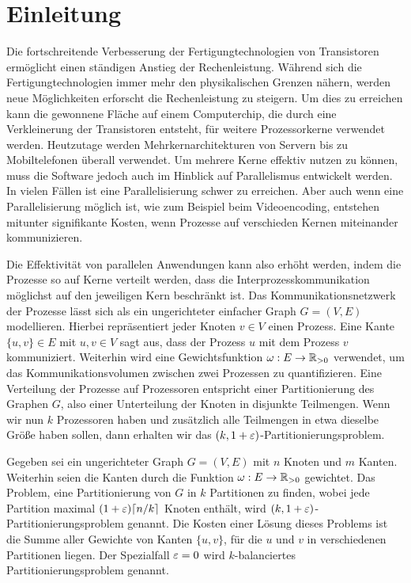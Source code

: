 
\chapter{Einleitung}\label{chapter:introduction}
Die fortschreitende Verbesserung der Fertigungtechnologien von Transistoren ermöglicht einen ständigen Anstieg der Rechenleistung.
Während sich die Fertigungtechnologien immer mehr den physikalischen Grenzen nähern, werden neue Möglichkeiten erforscht die Rechenleistung zu steigern.
Um dies zu erreichen kann die gewonnene Fläche auf einem Computerchip, die durch eine Verkleinerung der Transistoren entsteht, für weitere Prozessorkerne verwendet werden.
Heutzutage werden Mehrkernarchitekturen von Servern bis zu Mobiltelefonen überall verwendet.
Um mehrere Kerne effektiv nutzen zu können, muss die Software jedoch auch im Hinblick auf Parallelismus entwickelt werden.
In vielen Fällen ist eine Parallelisierung schwer zu erreichen.
Aber auch wenn eine Parallelisierung möglich ist, wie zum Beispiel beim Videoencoding, entstehen mitunter signifikante Kosten, wenn Prozesse auf verschieden Kernen miteinander kommunizieren.~\cite{LTS09}

Die Effektivität von parallelen Anwendungen kann also erhöht werden, indem die Prozesse so auf Kerne verteilt werden, dass die Interprozesskommunikation möglichst auf den jeweiligen Kern beschränkt ist.
Das Kommunikationsnetzwerk der Prozesse lässt sich als ein ungerichteter einfacher Graph $G = (V, E)$ modellieren.
Hierbei repräsentiert jeder Knoten $v \in V$ einen Prozess.
Eine Kante $\{u, v\} \in E$ mit $u, v \in V$ sagt aus, dass der Prozess $u$ mit dem Prozess $v$ kommuniziert.
Weiterhin wird eine Gewichtsfunktion $\omega : E \rightarrow \mathbb{R}_{>0}$ verwendet, um das Kommunikationsvolumen zwischen zwei Prozessen zu quantifizieren.
Eine Verteilung der Prozesse auf Prozessoren entspricht einer Partitionierung des Graphen $G$, also einer Unterteilung der Knoten in disjunkte Teilmengen.
Wenn wir nun $k$ Prozessoren haben und zusätzlich alle Teilmengen in etwa dieselbe Größe haben sollen, dann erhalten wir das $(k, 1 + \varepsilon)$\hyp Partitionierungsproblem.

\begin{defn}
    Gegeben sei ein ungerichteter Graph $G = (V, E)$ mit $n$ Knoten und $m$ Kanten.
    Weiterhin seien die Kanten durch die Funktion $\omega : E \rightarrow \mathbb{R}_{> 0}$ gewichtet.
    Das Problem, eine Partitionierung von $G$ in $k$ Partitionen zu finden, wobei jede Partition maximal $(1 + \varepsilon) \lceil n/k\rceil$ Knoten enthält, wird $(k,1 + \varepsilon)$\hyp Partitionierungsproblem genannt.
    Die Kosten einer Lösung dieses Problems ist die Summe aller Gewichte von Kanten $\{u, v\}$, für die $u$ und $v$ in verschiedenen Partitionen liegen.
    Der Spezialfall $\varepsilon=0$ wird $k$\hyp balanciertes Partitionierungsproblem genannt.
\end{defn}

